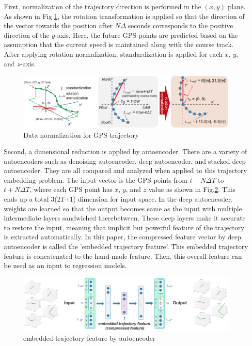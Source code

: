 \documentclass[runningheads]{llncs}
\begin{document}
First, normalization of the trajectory direction is performed in the $(x, y)$ plane. As shown in Fig.\ref{fig:data_normalization}, the rotation transformation is applied so that the direction of the vector towards the position after $N\Delta$ seconds corresponds to the positive direction of the $y$-axis. Here, the future GPS points are predicted based on the assumption that the current speed is maintained along with the course track. After applying rotation normalization, standardization is applied for each $x$, $y$, and $z$-axis.

\begin{figure}[t]
 \includegraphics[width=\textwidth]{fig/data_normalization.eps}
 \caption{Data normalization for GPS trajectory}
 \label{fig:data_normalization}
\end{figure}

Second, a dimensional reduction is applied by autoencoder. There are a variety of autoencoders such as denoising autoencoder\cite{ref_9}, deep autoencoder\cite{ref_10}, and stacked deep autoencoder\cite{ref_11}. They are all compared and analyzed when applied to this trajectory embedding problem. The input vector is the GPS points from $t-N\Delta T$ to $t+N\Delta T$, where each GPS point has $x$, $y$, and $z$ value as shown in Fig.\ref{fig:deep_autoencoder}. This ends up a total 3(2$T$+1) dimension for input space. In the deep autoencoder, weights are learned so that the output becomes same as the input with multiple intermediate layers sandwiched therebetween. These deep layers make it accurate to restore the input, meaning that implicit but powerful feature of the trajectory is extracted automatically. In this paper, the compressed feature vector by deep autoencoder is called the 'embedded trajectory feature'. This embedded trajectory feature is concatenated to the hand-made feature. Then, this overall feature can be used as an input to regression models.

\begin{figure}[t]
 \includegraphics[width=\textwidth]{fig/deep_autoencoder.eps}
 \caption{embedded trajectory feature by autoencoder}
 \label{fig:deep_autoencoder}
\end{figure}
\end{document}
